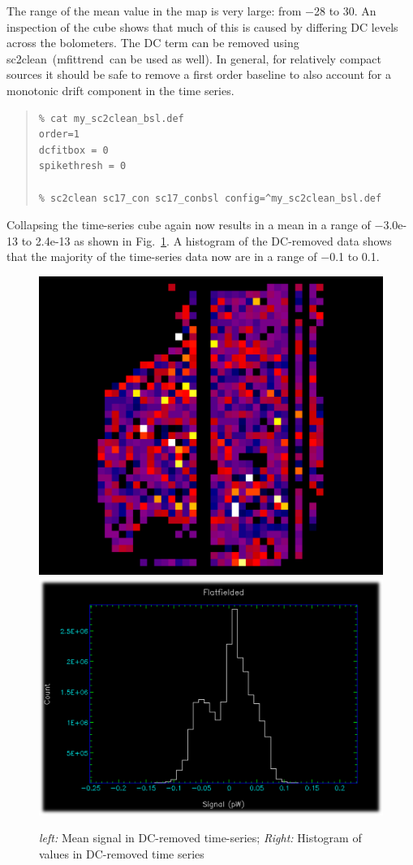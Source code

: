 \documentclass[twoside,11pt]{article}
\newcommand{\xref}[3]{#1}
\renewcommand{\_}{\texttt{\symbol{95}}}
\newenvironment{myquote}{\begin{quote}\begin{small}}{\end{small}\end{quote}}
\newcommand{\task}[1]{\textsf{#1}}
\newcommand{\clean}{\xref{\task{sc2clean}}{sun258}{SC2CLEAN}}
\newcommand{\mfittrend}{\xref{\task{mfittrend}}{sun95}{MFITTREND}}
\begin{document}
The range of the mean value in the map is very large: from $-$28 to
30. An inspection of the cube shows that much of this is caused by
differing DC levels across the bolometers. The DC term can be removed
using \clean\  (\mfittrend\ can be used as well). In general, for
relatively compact sources it should be safe to remove a first order
baseline to also account for a monotonic drift component in the time
series.

\begin{myquote}
\begin{verbatim}
% cat my_sc2clean_bsl.def
order=1
dcfitbox = 0
spikethresh = 0

% sc2clean sc17_con sc17_conbsl config=^my_sc2clean_bsl.def
\end{verbatim}
\end{myquote}

Collapsing the time-series cube again now results in a mean in a range
of $-$3.0e-13 to 2.4e-13 as shown in Fig.~\ref{fig:conbslcollapse}. A
histogram of the DC-removed data shows that the majority of the
time-series data now are in a range of $-$0.1 to 0.1.

\begin{figure}[ht]
\begin{center}
\includegraphics[width=0.45\linewidth]{sc19_conbsl_collapse}
\hspace{0.03\linewidth}
\includegraphics[width=0.45\linewidth]{sc19_bsl_histogram}
\caption{\textsl{left:} Mean signal in DC-removed time-series;
         \textsl{Right:} Histogram of values in DC-removed time series }
\label{fig:conbslcollapse}
\end{center}
\end{figure}
\end{document}
